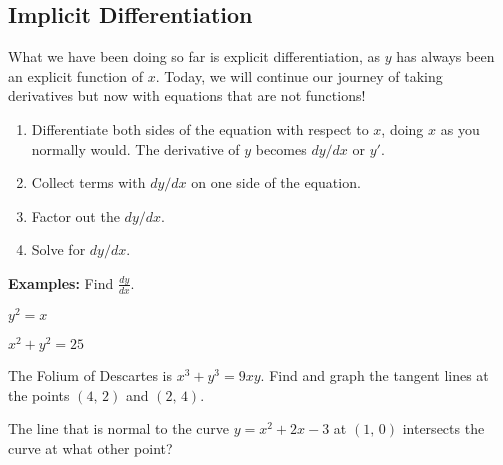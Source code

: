 \documentclass[addpoints, 12pt]{exam}
\begin{document}
\subsection*{Implicit Differentiation}
What we have been doing so far is explicit differentiation, as $y$ has always been an explicit function of $x$. Today, we will continue our journey of taking derivatives but now with equations that are not functions!\\
\begin{tcolorbox}[title= STEPS FOR IMPLICIT DIFFERENTIATION,colframe=black,sharp corners,colback=white,colbacktitle=white,coltitle=black,boxrule=1pt]
    \begin{enumerate}
        \item Differentiate both sides of the equation with respect to $x$, doing $x$ as you normally would. The derivative of $y$ becomes $dy/dx$ or $y'$.
        \item Collect terms with $dy/dx$ on one side of the equation.
        \item Factor out the $dy/dx$.
        \item Solve for $dy/dx$.
    \end{enumerate}
\end{tcolorbox}
\vspace{.15cm}
\noindent\textbf{Examples:} Find $\displaystyle\frac{dy}{dx}$.
\begin{questions}
    \begin{minipage}{.45\linewidth}
    \question $\displaystyle y^2=x$
    \end{minipage}
    \hfill
    \begin{minipage}{.45\linewidth}
    \question $\displaystyle x^2+y^2=25$
    \end{minipage}
    
    
    \question The Folium of Descartes is $x^3+y^3=9xy$. Find and graph the tangent lines at the points $(4,\,2)$ and $(2,\,4)$.
    
    
    
    \newpage
    
    \question The line that is normal to the curve $y=x^2+2x-3$ at $(1,\,0)$ intersects the curve at what other point?
    
\end{questions}
\end{document}
